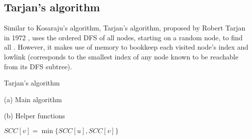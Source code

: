 \subsection{Tarjan's algorithm} \label{algorithm-scc-tarjan}
Similar to Kosaraju's algorithm, Tarjan's algorithm, proposed by Robert Tarjan in 1972 \cite{tarjan72}, uses the ordered DFS of all nodes, starting on a random node, to find all . However, it makes use of memory to bookkeep each visited node's index and lowlink (corresponds to the smallest index of any node known to be reachable from its DFS subtree). 
\begin{center}
    \begin{algorithm}[H]
        \caption{Tarjan's algorithm}
        \label{alg-tarjan}
        \begin{minipage}[t]{0.40\linewidth}
            (a) Main algorithm
            \begin{algorithmic}[1]
                    \EndFor
                        \EndIf
                    \EndFor
                    \State {}
                \EndFunction
            \end{algorithmic}
        \end{minipage}
        \begin{minipage}[t]{0.58\textwidth}
            (b) Helper functions
            \begin{algorithmic}[1]


                         {}
                        \EndIf
                         {$SCC[v] = \min \{SCC[u], SCC[v]\}$}
                        \EndIf
                    \EndFor

                        \EndWhile
                    \EndIf
                \EndFunction
            \end{algorithmic}
        \end{minipage}
    \end{algorithm}
\end{center}
